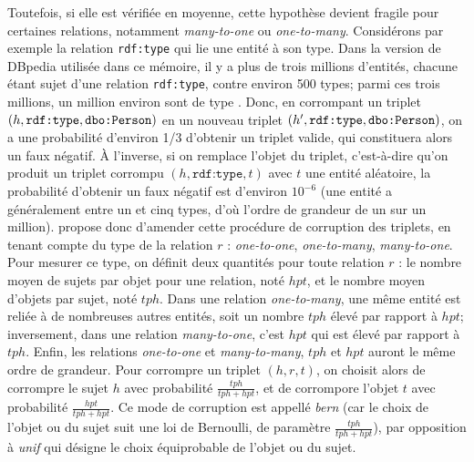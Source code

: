 Toutefois, si elle est vérifiée en moyenne, cette hypothèse devient fragile pour certaines relations, notamment \textit{many-to-one} ou \textit{one-to-many}. Considérons par exemple la relation \texttt{rdf:type} qui lie une entité à son type. Dans la version de DBpedia utilisée dans ce mémoire, il y a plus de trois millions d'entités, chacune étant sujet d'une relation \texttt{rdf:type}, contre environ 500 types; parmi ces trois millions, un million environ sont de type . Donc, en corrompant un triplet $(h, \texttt{rdf:type}, \texttt{dbo:Person})$ en un nouveau triplet $(h', \texttt{rdf:type}, \texttt{dbo:Person})$, on a une probabilité d'environ 1/3 d'obtenir un triplet valide, qui constituera alors un faux négatif. À l'inverse, si on remplace l'objet du triplet, c'est-à-dire qu'on produit un triplet corrompu  $(h, \texttt{rdf:type}, t)$ avec $t$ une entité aléatoire, la probabilité d'obtenir un faux négatif est d'environ $10^{-6}$ (une entité a généralement entre un et cinq types, d'où l'ordre de grandeur de un sur un million).
\cite{transh} propose donc d'amender cette procédure de corruption des triplets, en tenant compte du type de la relation $r$ : \textit{one-to-one}, \textit{one-to-many}, \textit{many-to-one}. Pour mesurer ce type, on définit deux quantités pour toute relation $r$ : le nombre moyen de sujets par objet pour une relation, noté $hpt$, et le nombre moyen d'objets par sujet, noté $tph$. Dans une relation \textit{one-to-many}, une même entité est reliée à de nombreuses autres entités, soit un nombre $tph$ élevé par rapport à $hpt$; inversement, dans une relation \textit{many-to-one}, c'est $hpt$ qui est élevé par rapport à $tph$. Enfin, les relations \textit{one-to-one} et \textit{many-to-many}, $tph$ et $hpt$ auront le même ordre de grandeur. Pour corrompre un triplet $(h, r, t)$, on choisit alors de corrompre le sujet $h$ avec probabilité $\frac{tph}{tph + hpt}$, et de corrompore l'objet $t$ avec probabilité $\frac{hpt}{tph + hpt}$. Ce mode de corruption est appellé \textit{bern} (car le choix de l'objet ou du sujet suit une loi de Bernoulli, de paramètre $\frac{tph}{tph + hpt}$), par opposition à \textit{unif} qui désigne le choix équiprobable de l'objet ou du sujet.










